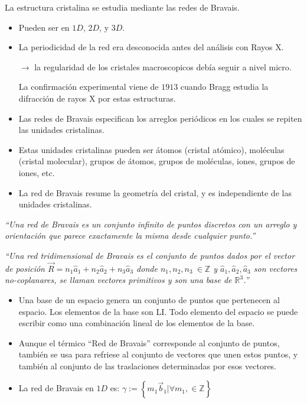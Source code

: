 La estructura cristalina se estudia mediante las redes de Bravais.

\begin{itemize}
    \item Pueden ser en $1D$, $2D$, y $3D$.
    \item La periodicidad de la red era desconocida antes del análisis con Rayos X.
    
    $\rightarrow$ la regularidad de los cristales macroscopicos debía seguir a nivel micro.
    
    La confirmación experimental viene de $1913$ cuando Bragg estudia la difracción de rayos X por estas estructuras.
    \item Las redes de Bravais especifican los arreglos periódicos en los cuales se repiten las unidades cristalinas.
    \item Estas unidades cristalinas pueden ser átomos (cristal atómico), moléculas (cristal molecular), grupos de átomos, grupos de moléculas, iones, grupos de iones, etc.
    \item La red de Bravais resume la geometría del cristal, y es independiente de las unidades cristalinas.
\end{itemize}

\textit{``Una red de Bravais es un conjunto infinito de puntos discretos con un arreglo y orientación que parece exactamente la misma desde cualquier punto.''}

\textit{``Una red tridimensional de Bravais es el conjunto de puntos dados por el vector de posición $\vec{R}=n_1\hat{a}_1+n_2\hat{a}_2+n_3\hat{a}_3$ donde $n_1,n_2,n_3~\in\mathbb{Z}$ y  $\hat{a}_1,\hat{a}_2,\hat{a}_3$ son vectores no-coplanares, se llaman vectores primitivos y son una base de $\mathbb{R}^3$.''}

\begin{itemize}
    \item Una base de un espacio genera un conjunto de puntos que pertenecen al espacio. Los elementos de la base son LI. Todo elemento del espacio se puede escribir como una combinación lineal de los elementos de la base.
    \item Aunque el térmico ``Red de Bravais'' corresponde al conjunto de puntos, también se usa para refriese al conjunto de vectores que unen estos puntos, y también al conjunto de las traslaciones determinadas por esos vectores. 
    \item La red de Bravais en $1D$ es: $\gamma:=\left\{m_1\vec{b}_1\lvert\forall m_1, \in \mathbb{Z}\right\}$
\end{itemize}

